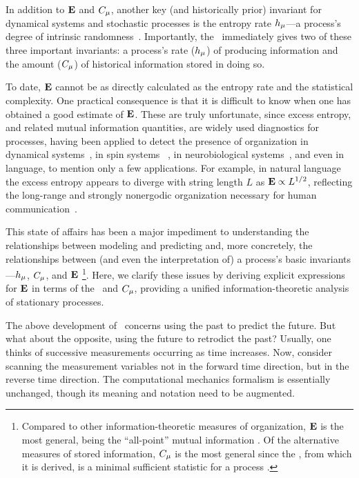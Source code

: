 \documentclass[prl,twocolumn,showpacs,superscriptaddress,preprintnumbers,floatfix]{revtex4}
\theoremstyle{plain}    \newtheorem{Lem}{Lemma}
\theoremstyle{plain}    \newtheorem*{ProLem}{Proof}
\theoremstyle{plain} 	\newtheorem{Cor}{Corollary}
\theoremstyle{plain} 	\newtheorem*{ProCor}{Proof}
\theoremstyle{plain} 	\newtheorem{The}{Theorem}
\theoremstyle{plain} 	\newtheorem*{ProThe}{Proof}
\theoremstyle{plain} 	\newtheorem{Prop}{Proposition}
\theoremstyle{plain} 	\newtheorem*{ProProp}{Proof}
\theoremstyle{plain} 	\newtheorem*{Conj}{Conjecture}
\theoremstyle{plain}	\newtheorem*{Rem}{Remark}
\theoremstyle{plain}	\newtheorem*{Def}{Definition}
\theoremstyle{plain}	\newtheorem*{Not}{Notation}
\begin{document}
In addition to ${\bf E}$ and ${C_\mu}$, another key (and historically prior)
invariant for dynamical systems and stochastic processes is the entropy rate
${h_\mu}$---a process's degree of intrinsic randomness~\cite{Shan48a}. Importantly,
the \eM\ immediately gives two of these three important invariants: a process's
rate (${h_\mu}$) of producing information and the amount (${C_\mu}$) of historical
information stored in doing so.

To date, ${\bf E}$ cannot be as directly calculated as the entropy rate and the 
statistical complexity. One practical consequence is that it is difficult to
know when one has obtained a good estimate of ${\bf E}$. These are truly
unfortunate, since excess entropy, and related mutual information quantities,
are widely used diagnostics
for processes, having been applied to detect the presence of organization in
dynamical systems~\cite{Fras86a,Casd91a,Spro03a,Kant06a}, in spin systems~%
\cite{Crut97a,Erb04a}, in neurobiological systems~\cite{Tono94a,Bial00a}, and
even in language, to mention only a few applications. For example, in natural
language the excess entropy appears to diverge with string length $L$ as
${\bf E} \propto L^{1/2}$, reflecting the long-range and strongly nonergodic
organization necessary for human communication~\cite{Ebel94c,Debo08a}.

This state of affairs has been a major impediment to understanding the
relationships between modeling and predicting and, more concretely, the
relationships between (and even the interpretation of) a process's basic
invariants---${h_\mu}$, ${C_\mu}$, and ${\bf E}$
\footnote{Compared to other information-theoretic measures of organization,
${\bf E}$ is the most general, being the ``all-point'' mutual information
\cite{Crut01a}.
Of the alternative measures of stored information, ${C_\mu}$ is the most
general since the \eM, from which it is derived, is a minimal
sufficient statistic for a process \cite{CompMechMerge}.}.
Here, we clarify these issues by deriving explicit expressions for ${\bf E}$ in
terms of the \eM\ and ${C_\mu}$, providing a unified information-theoretic
analysis of stationary processes.

The above development of \eMs\ concerns using the past to predict the future.
But what about the opposite, using the future to retrodict the past?
Usually, one thinks of successive measurements occurring as time
increases. Now, consider scanning the measurement variables not in
the forward time direction, but in the reverse time direction. The 
computational mechanics formalism is essentially unchanged, though its meaning 
and notation need to be augmented.
\end{document}
